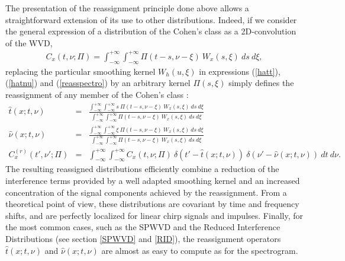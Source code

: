   The presentation of the reassignment principle done above allows a
straightforward extension of its use to other distributions. Indeed,
if we consider the general expression of a distribution of the Cohen's
class as a 2D-convolution of the WVD, 
\begin{eqnarray*}
C_x(t,\nu;\Pi)=\int_{-\infty}^{+\infty}\int_{-\infty}^{+\infty}
\Pi(t-s,\nu-\xi)\ W_x(s,\xi)\ ds\ d\xi, 
\end{eqnarray*}
replacing the particular smoothing kernel $W_h(u,\xi)$ in expressions
(\ref{hatt}), (\ref{hatnu}) and (\ref{reasspectro}) by an arbitrary kernel
$\Pi(s,\xi)$ simply defines the reassignment of any member of the Cohen's
class :
\begin{eqnarray*}
\hat{t}(x;t,\nu) &=&
\frac{\int_{-\infty}^{+\infty}\int_{-\infty}^{+\infty} s\
\Pi(t-s,\nu-\xi)\ W_x(s,\xi)\ ds\ d\xi} 
 {\int_{-\infty}^{+\infty}\int_{-\infty}^{+\infty} \Pi(t-s,\nu-\xi)\
W_x(s,\xi)\ ds\ d\xi}\\ 
\hat{\nu}(x;t,\nu)&=&
\frac{\int_{-\infty}^{+\infty}\int_{-\infty}^{+\infty} \xi\
\Pi(t-s,\nu-\xi)\ W_x(s,\xi)\ ds\ d\xi} 
 {\int_{-\infty}^{+\infty}\int_{-\infty}^{+\infty} \Pi(t-s,\nu-\xi)\
W_x(s,\xi)\ ds\ d\xi}\\ 
C_x^{(r)}(t',\nu';\Pi)&=&\int_{-\infty}^{+\infty}\int_{-\infty}^{+\infty}
C_x(t,\nu;\Pi)\ \delta(t'-\hat{t}(x;t,\nu))\
\delta(\nu'-\hat{\nu}(x;t,\nu))\ dt\ d\nu.	       
\end{eqnarray*}
The resulting reassigned distributions efficiently combine a reduction of
the interference terms provided by a well adapted smoothing kernel and an
increased concentration of the signal components achieved by the
reassignment. From a theoretical point of view, these distributions are
covariant by time and frequency shifts, and are perfectly localized for
linear chirp signals and impulses. Finally, for the most common cases, such
as the SPWVD and the Reduced Interference Distributions (see section
\ref{SPWVD} and \ref{RID}), the reassignment operators $\hat{t}(x;t,\nu)$ and
$\hat{\nu}(x;t,\nu)$ are almost as easy to compute as for the spectrogram.


